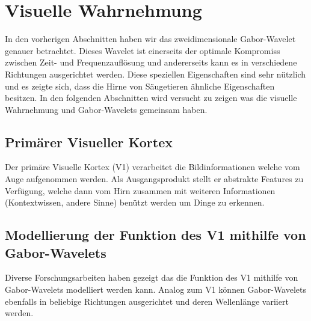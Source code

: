 \section{Visuelle Wahrnehmung}

In den vorherigen Abschnitten haben wir das zweidimensionale Gabor-Wavelet genauer betrachtet.
Dieses Wavelet ist einerseits der optimale Kompromiss zwischen Zeit- und Frequenzauflösung und andererseits kann es in verschiedene Richtungen ausgerichtet werden.
Diese speziellen Eigenschaften sind sehr nützlich und es zeigte sich, dass die Hirne von Säugetieren ähnliche Eigenschaften besitzen.
In den folgenden Abschnitten wird versucht zu zeigen was die visuelle Wahrnehmung und Gabor-Wavelets gemeinsam haben. 

\subsection{Primärer Visueller Kortex}

Der primäre Visuelle Kortex (V1) verarbeitet die Bildinformationen welche vom Auge aufgenommen werden.
Als Ausgangsprodukt stellt er abstrakte Features zu Verfügung, welche dann vom Hirn zusammen mit weiteren Informationen (Kontextwissen, andere Sinne)  benützt werden um Dinge zu erkennen.


\subsection{Modellierung der Funktion des V1 mithilfe von Gabor-Wavelets}

Diverse Forschungsarbeiten haben gezeigt das die Funktion des V1 mithilfe von Gabor-Wavelets modelliert werden kann. %
Analog zum V1 können Gabor-Wavelets ebenfalls in beliebige Richtungen ausgerichtet und deren Wellenlänge variiert werden.